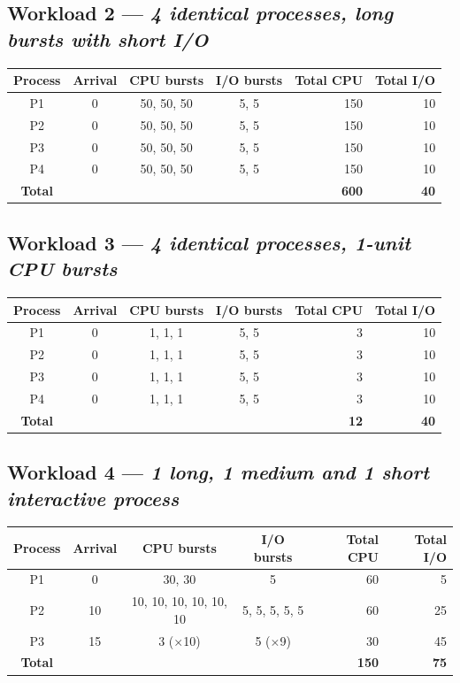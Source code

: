 \documentclass[11pt,a4paper]{article}
\begin{document}
\subsection*{Workload 2 --- \textit{4 identical processes, long bursts with short I/O}}
\begin{center}\small\begin{tabular}{ccccrr}\toprule
Process & Arrival & CPU bursts & I/O bursts & Total CPU & Total I/O \\\midrule
P1 & 0 & 50, 50, 50 & 5, 5 & 150 & 10 \\
P2 & 0 & 50, 50, 50 & 5, 5 & 150 & 10 \\
P3 & 0 & 50, 50, 50 & 5, 5 & 150 & 10 \\
P4 & 0 & 50, 50, 50 & 5, 5 & 150 & 10 \\
\midrule
\textbf{Total} & & & & \textbf{600} & \textbf{40} \\
\bottomrule\end{tabular}\end{center}
\subsection*{Workload 3 --- \textit{4 identical processes, 1-unit CPU bursts}}
\begin{center}\small\begin{tabular}{ccccrr}\toprule
Process & Arrival & CPU bursts & I/O bursts & Total CPU & Total I/O \\\midrule
P1 & 0 & 1, 1, 1 & 5, 5 & 3 & 10 \\
P2 & 0 & 1, 1, 1 & 5, 5 & 3 & 10 \\
P3 & 0 & 1, 1, 1 & 5, 5 & 3 & 10 \\
P4 & 0 & 1, 1, 1 & 5, 5 & 3 & 10 \\
\midrule
\textbf{Total} & & & & \textbf{12} & \textbf{40} \\
\bottomrule\end{tabular}\end{center}
\subsection*{Workload 4 --- \textit{1 long, 1 medium and 1 short interactive process}}
\begin{center}\small\begin{tabular}{ccccrr}\toprule
Process & Arrival & CPU bursts & I/O bursts & Total CPU & Total I/O \\\midrule
P1 & 0 & 30, 30 & 5 & 60 & 5 \\
P2 & 10 & 10, 10, 10, 10, 10, 10 & 5, 5, 5, 5, 5 & 60 & 25 \\
P3 & 15 & 3 ($\times$10) & 5 ($\times$9) & 30 & 45 \\
\midrule
\textbf{Total} & & & & \textbf{150} & \textbf{75} \\
\bottomrule\end{tabular}\end{center}
\end{document}

